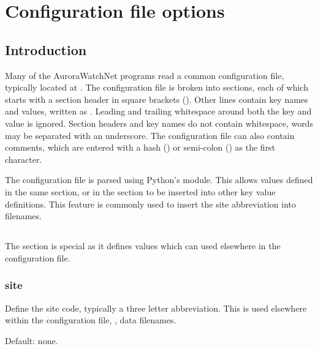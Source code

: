 \chapter{Configuration file options}

\newcommand{\configexample}[2][]{\examplebox[#1]{#2}}

\section{Introduction}
Many of the AuroraWatchNet programs read a common configuration file,
typically located at . The configuration file
is broken into sections, each of which starts with a section header in
square brackets (). Other lines contain key names
and values, written as . Leading and trailing
whitespace around both the key and value is ignored. Section headers
and key names do not contain whitespace, words may be separated with an
underscore. The configuration file can also contain comments, which
are entered with a hash (\code{\#}) or semi-colon (\code{;}) as the
first character.

The configuration file is parsed using Python's 
module. This allows values defined in the same section, or in the
\code{[DEFAULT]} section to be inserted into other key value
definitions. This feature is commonly used to insert the site
abbreviation into filenames.

\section{\code{[DEFAULT]}}

The \code{[DEFAULT]} section is special as it defines values which can
used elsewhere in the configuration file.

\subsection{site}
Define the site code, typically a three letter abbreviation. This is
used elsewhere within the configuration file, \eg, data filenames.

Default: none.

\configexample{\code{site = lan1}}

\section{\code{[awnettextdata]}}

